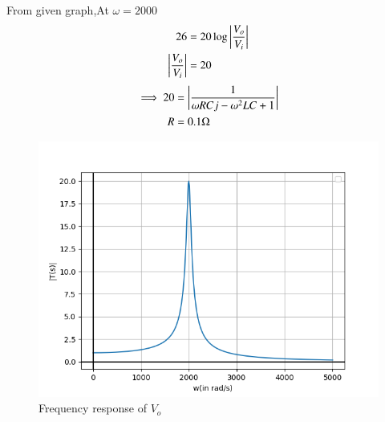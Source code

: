 \documentclass[journal,12pt,twocolumn]{IEEEtran}
\theoremstyle{remark}
\begin{document}
From given graph,At $\omega = 2000$
\begin{align}
    26 &= 20 \log \left\vert\frac{V_o}{V_i}\right\vert\\
    \left\vert\frac{V_o}{V_i}\right\vert &= 20
\end{align}
\begin{align}
    \implies 20 &= \left\vert\frac{1}{\omega RCj -\omega^2LC + 1}\right\vert \\
    R &= 0.1 \Omega
\end{align}
\begin{figure}[!h]
    \centering
    \includegraphics[width=\columnwidth]{2021/EE/20/figs/frequency_response.png}
    \caption{Frequency response of $V_o$}
    \label{frequency_response_2021_EE_20}
\end{figure}
\end{document}
